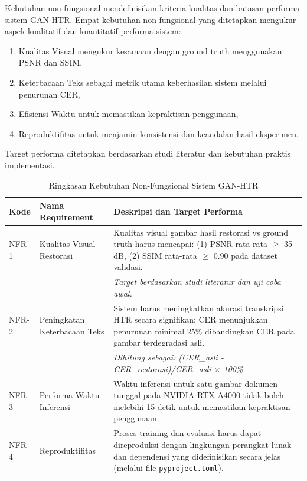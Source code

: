 \documentclass[12pt,a4paper]{article}
\begin{document}
Kebutuhan non-fungsional mendefinisikan kriteria kualitas dan batasan performa sistem GAN-HTR. Empat kebutuhan non-fungsional yang ditetapkan mengukur aspek kualitatif dan kuantitatif performa sistem:

\begin{enumerate}
    \item Kualitas Visual mengukur kesamaan dengan ground truth menggunakan PSNR dan SSIM,
    \item Keterbacaan Teks sebagai metrik utama keberhasilan sistem melalui penurunan CER,
    \item Efisiensi Waktu untuk memastikan kepraktisan penggunaan,
    \item Reproduktifitas untuk menjamin konsistensi dan keandalan hasil eksperimen.
\end{enumerate}
Target performa ditetapkan berdasarkan studi literatur dan kebutuhan praktis implementasi.

\begin{table}[htbp!]
\centering
\small
\caption{Ringkasan Kebutuhan Non-Fungsional Sistem GAN-HTR}
\label{tab:non_functional_requirements}
\begin{tabular}{p{}p{}p{}}
\toprule
\textbf{Kode} & \textbf{Nama Requirement} & \textbf{Deskripsi dan Target Performa} \\
\midrule
NFR-1 & Kualitas Visual Restorasi & Kualitas visual gambar hasil restorasi vs ground truth harus mencapai: (1) PSNR rata-rata $\geq$ 35 dB, (2) SSIM rata-rata $\geq$ 0.90 pada dataset validasi. \\[0.3em]
   & & \textit{Target berdasarkan studi literatur dan uji coba awal.} \\
\midrule
NFR-2 & Peningkatan Keterbacaan Teks & Sistem harus meningkatkan akurasi transkripsi HTR secara signifikan: CER menunjukkan penurunan minimal 25\% dibandingkan CER pada gambar terdegradasi asli. \\[0.3em]
   & & \textit{Dihitung sebagai: (CER\_asli - CER\_restorasi)/CER\_asli $\times$ 100\%}. \\
\midrule
NFR-3 & Performa Waktu Inferensi & Waktu inferensi untuk satu gambar dokumen tunggal pada NVIDIA RTX A4000 tidak boleh melebihi 15 detik untuk memastikan kepraktisan penggunaan. \\
\midrule
NFR-4 & Reproduktifitas & Proses training dan evaluasi harus dapat direproduksi dengan lingkungan perangkat lunak dan dependensi yang didefinisikan secara jelas (melalui file \texttt{pyproject.toml}). \\
\bottomrule
\end{tabular}
\end{table}
\end{document}
